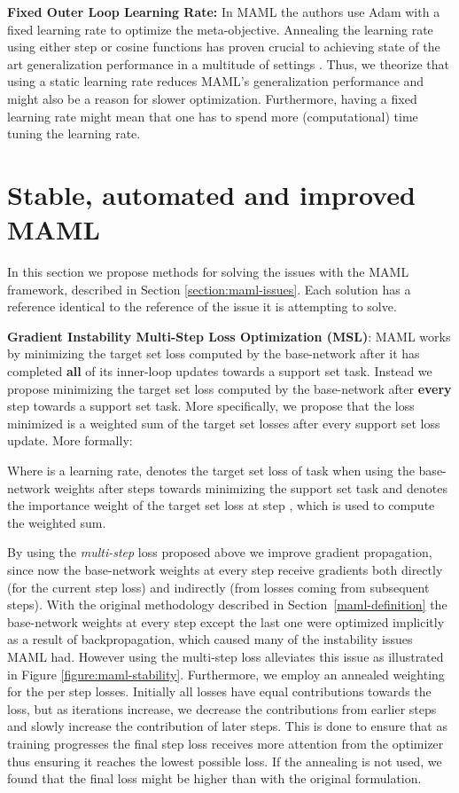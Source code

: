 \documentclass{article} \usepackage[dvipsnames]{xcolor}
\begin{document}
\textbf{Fixed Outer Loop Learning Rate:} In MAML the authors use Adam with a fixed learning rate to optimize the meta-objective. Annealing the learning rate using either step or cosine functions has proven crucial to achieving state of the art generalization performance in a multitude of settings \citep{loshchilov2016sgdr,he2016deep,larsson2016fractalnet,huang2017densely}. Thus, we theorize that using a static learning rate reduces MAML's generalization performance and might also be a reason for slower optimization. Furthermore, having a fixed learning rate might mean that one has to spend more (computational) time tuning the learning rate.



\section{Stable, automated and improved MAML}\label{section:maml-fix}
In this section we propose methods for solving the issues with the MAML framework, described in Section \ref{section:maml-issues}. Each solution has a reference identical to the reference of the issue it is attempting to solve.

\textbf{Gradient Instability  Multi-Step Loss Optimization (MSL)}: MAML works by minimizing the target set loss computed by the base-network after it has completed \textbf{all} of its inner-loop updates towards a support set task. Instead we propose minimizing the target set loss computed by the base-network after \textbf{every} step towards a support set task. More specifically, we propose that the loss minimized is a weighted sum of the target set losses after every support set loss update. More formally:

Where  is a learning rate,  denotes the target set loss of task  when using the base-network weights after  steps towards minimizing the support set task and  denotes the importance weight of the target set loss at step , which is used to compute the weighted sum.

By using the \emph{multi-step} loss proposed above we improve gradient propagation, since now the base-network weights at every step receive gradients both directly (for the current step loss) and indirectly (from losses coming from subsequent steps). With the original methodology described in Section~\ref{maml-definition} the base-network weights at every step except the last one were optimized implicitly as a result of backpropagation, which caused many of the instability issues MAML had. However using the multi-step loss alleviates this issue as illustrated in Figure \ref{figure:maml-stability}. Furthermore, we employ an annealed weighting for the per step losses. Initially all losses have equal contributions towards the loss, but as iterations increase, we decrease the contributions from earlier steps and slowly increase the contribution of later steps. This is done to ensure that as training progresses the final step loss receives more attention from the optimizer thus ensuring it reaches the lowest possible loss. If the annealing is not used, we found that the final loss might be higher than with the original formulation.
\end{document}
